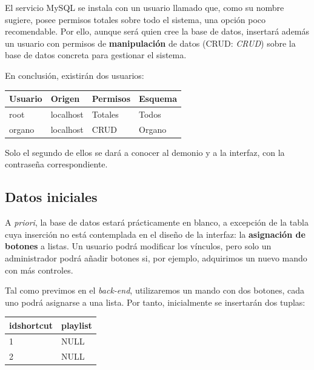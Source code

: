 El servicio MySQL se instala con un usuario llamado \textbf{} que, como su nombre sugiere, posee permisos totales sobre todo el sistema, una opción poco recomendable. Por ello, aunque será  quien cree la base de datos, insertará además un usuario con permisos de \textbf{manipulación} de datos (\acrshort{CRUD}: \textit{\acrlong{CRUD}}) sobre la base de datos concreta para gestionar el sistema.

En conclusión, existirán dos usuarios:

\smallskip

\begin{center}
	\begin{tabular}{|l|l|l|l|}
		\hline \textbf{Usuario} & \textbf{Origen} & \textbf{Permisos} & \textbf{Esquema} \\ 
		\hline root & localhost & Totales & Todos \\
		\hline organo & localhost & \acrshort{CRUD} & Organo \\ 
		\hline 
	\end{tabular}
	\smallskip
\end{center}

\smallskip

Solo el segundo de ellos se dará a conocer al demonio y a la interfaz, con la contraseña correspondiente.

\subsection{Datos iniciales}

A \textit{priori}, la base de datos estará prácticamente en blanco, a excepción de la tabla cuya inserción no está contemplada en el diseño de la interfaz: la \textbf{asignación de botones} a listas. Un usuario podrá modificar los vínculos, pero solo un administrador podrá añadir botones si, por ejemplo, adquirimos un nuevo mando con más controles.

Tal como previmos en el \textit{back-end}, utilizaremos un mando con dos botones, cada uno podrá asignarse a una lista. Por tanto, inicialmente se insertarán dos tuplas:

\smallskip

\begin{center}
	\begin{tabular}{|l|l|}
		\hline \textbf{idshortcut} & \textbf{playlist} \\ 
		\hline 1 & NULL \\
		\hline 2 & NULL \\ 
		\hline 
	\end{tabular}
	\smallskip
\end{center}

